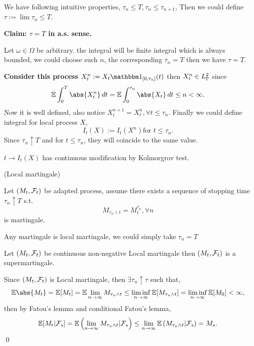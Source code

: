 We have following intuitive properties, $\tau_n \leq T, \tau_n \leq \tau_{n+1}$, Then we could define $\tau := \lim \tau_n \leq T$.

\textbf{Claim: $\tau = T$ in a.s. sense.}

Let $\omega\in\Omega$ be arbitrary. the integral will be finite integral which is always bounded, we could choose such $n$, the corresponding $\tau_n = T$ then we have $\tau = T$.

\textbf{Consider this process $X_t^n := X_t\I{[0,\tau_n]}(t)$} then $X_t^n \in L_{\mathbb{P}}^{2}$ since
\begin{equation*}
     \E\int_0^T \abs{X_t^n} \diff t = \E\int_0^{\tau_n} \abs{X_t} \diff t \leq n < \infty.
\end{equation*} 
Now it is well defined, also notice $X_t^{n+1} = X_t^n, \forall t \leq \tau_n$. Finally we could define \ito integral for local process $X$,
\begin{equation*}
    I_t(X):= I_t(X^n) \text{for } t\leq \tau_n.
\end{equation*}
Since $\tau_n \uparrow T$ and for $t\leq \tau_n$, they will coincide to the same value.

\begin{prop}
$t \to I_t(X)$ has continuous modification by Kolmorgrov test.
\end{prop}

\begin{dfn}(Local martingale)

Let $(M_t, \mathcal{F}_t)$ be adapted process, assume there exists a sequence of stopping time $\tau_n \uparrow T$ s.t. 
\begin{equation*}
    M_{\tau_n \land t} = M_t^{\tau_n}, \forall n
\end{equation*} is martingale.
\end{dfn}

\begin{rem}
Any martingale is local martingale, we could simply take $\tau_n = T$
\end{rem}

\begin{thm}
Let $(M_t, \mathcal{F}_t)$ be continuous non-negative Local martingale then $(M_t, \mathcal{F}_t)$ is a supermartingale.
\end{thm}
\pf Since $(M_t, \mathcal{F}_t)$ is Local martingale, then $\exists \tau_n \uparrow \tau$ such that,
\begin{equation*}
    \E\abs{M_t} = \E [M_t] = \E \lim_{n\rightarrow \infty} M_{\tau_n \land t} \leq \linf{n\rightarrow \infty} \E [M_{\tau_n \land t}] = \linf{n\rightarrow \infty} \E [M_0 ]< \infty,
\end{equation*}
then by Fatou's lemma and conditional Fatou's lemma,
\begin{equation*}
    \mathbb{E} [M_t|\mathcal{F}_s] = \mathbb{E} \left(\lim_{n\rightarrow \infty} M_{\tau_n \land t}|\mathcal{F}_s\right) \leq \lim_{n\rightarrow \infty} \mathbb{E} \left( M_{\tau_n \land t}|\mathcal{F}_s\right) = M_s.
\end{equation*}
\qed


